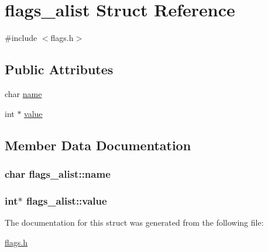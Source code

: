 \hypertarget{structflags__alist}{}\section{flags\+\_\+alist Struct Reference}
\label{structflags__alist}


{\ttfamily \#include $<$flags.\+h$>$}

\subsection*{Public Attributes}
\begin{DoxyCompactItemize}
\item 
char \hyperlink{structflags__alist_a36e3c464caa116130903e13f2d777664}{name}
\item 
int $\ast$ \hyperlink{structflags__alist_a0389c0a127a69da0296a56a9f3f5aee1}{value}
\end{DoxyCompactItemize}


\subsection{Member Data Documentation}
\subsubsection[{\texorpdfstring{name}{name}}]{\setlength{\rightskip}{0pt plus 5cm}char flags\+\_\+alist\+::name}\hypertarget{structflags__alist_a36e3c464caa116130903e13f2d777664}{}\label{structflags__alist_a36e3c464caa116130903e13f2d777664}
\subsubsection[{\texorpdfstring{value}{value}}]{\setlength{\rightskip}{0pt plus 5cm}int$\ast$ flags\+\_\+alist\+::value}\hypertarget{structflags__alist_a0389c0a127a69da0296a56a9f3f5aee1}{}\label{structflags__alist_a0389c0a127a69da0296a56a9f3f5aee1}


The documentation for this struct was generated from the following file\+:\begin{DoxyCompactItemize}
\item 
\hyperlink{flags_8h}{flags.\+h}\end{DoxyCompactItemize}
